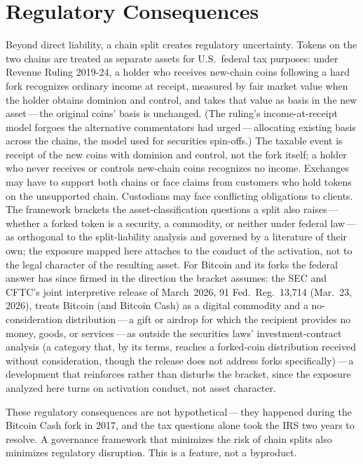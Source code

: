 \documentclass[11pt, twoside, openright]{book}
\begin{document}
\section{Regulatory Consequences}

Beyond direct liability, a chain split creates regulatory uncertainty. Tokens on the two chains are treated as separate assets for U.S.~federal tax purposes: under Revenue Ruling 2019-24, a holder who receives new-chain coins following a hard fork recognizes ordinary income at receipt, measured by fair market value when the holder obtains dominion and control, and takes that value as basis in the new asset\,---\,the original coins' basis is unchanged. (The ruling's income-at-receipt model forgoes the alternative commentators had urged\,---\,allocating existing basis across the chains, the model used for securities spin-offs.) The taxable event is receipt of the new coins with dominion and control, not the fork itself; a holder who never receives or controls new-chain coins recognizes no income. Exchanges may have to support both chains or face claims from customers who hold tokens on the unsupported chain. Custodians may face conflicting obligations to clients. The framework brackets the asset-classification questions a split also raises\,---\,whether a forked token is a security, a commodity, or neither under federal law\,---\,as orthogonal to the split-liability analysis and governed by a literature of their own; the exposure mapped here attaches to the conduct of the activation, not to the legal character of the resulting asset. For Bitcoin and its forks the federal answer has since firmed in the direction the bracket assumes: the SEC and CFTC's joint interpretive release of March~2026, 91 Fed.~Reg.~13{,}714 (Mar.~23, 2026), treats Bitcoin (and Bitcoin Cash) as a digital commodity and a no-consideration distribution\,---\,a gift or airdrop for which the recipient provides no money, goods, or services\,---\,as outside the securities laws' investment-contract analysis (a category that, by its terms, reaches a forked-coin distribution received without consideration, though the release does not address forks specifically)\,---\,a development that reinforces rather than disturbs the bracket, since the exposure analyzed here turns on activation conduct, not asset character.

These regulatory consequences are not hypothetical\,---\,they happened during the Bitcoin Cash fork in 2017, and the tax questions alone took the IRS two years to resolve. A governance framework that minimizes the risk of chain splits also minimizes regulatory disruption. This is a feature, not a byproduct.
\end{document}
